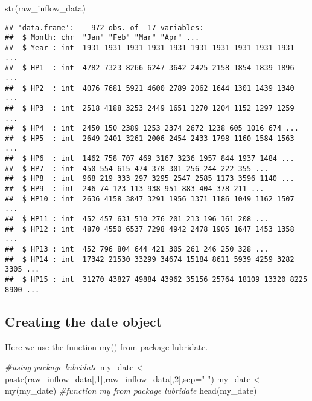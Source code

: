 \documentclass[
]{article}
\newenvironment{Shaded}{\begin{snugshade}}{\end{snugshade}}
\newcommand{\AttributeTok}[1]{\textcolor[rgb]{0.77,0.63,0.00}{#1}}
\newcommand{\CommentTok}[1]{\textcolor[rgb]{0.56,0.35,0.01}{\textit{#1}}}
\newcommand{\DecValTok}[1]{\textcolor[rgb]{0.00,0.00,0.81}{#1}}
\newcommand{\FunctionTok}[1]{\textcolor[rgb]{0.00,0.00,0.00}{#1}}
\newcommand{\NormalTok}[1]{#1}
\newcommand{\OtherTok}[1]{\textcolor[rgb]{0.56,0.35,0.01}{#1}}
\newcommand{\StringTok}[1]{\textcolor[rgb]{0.31,0.60,0.02}{#1}}
\begin{document}
\begin{Shaded}
\begin{Highlighting}[]
\FunctionTok{str}\NormalTok{(raw\_inflow\_data)}
\end{Highlighting}
\end{Shaded}

\begin{verbatim}
## 'data.frame':    972 obs. of  17 variables:
##  $ Month: chr  "Jan" "Feb" "Mar" "Apr" ...
##  $ Year : int  1931 1931 1931 1931 1931 1931 1931 1931 1931 1931 ...
##  $ HP1  : int  4782 7323 8266 6247 3642 2425 2158 1854 1839 1896 ...
##  $ HP2  : int  4076 7681 5921 4600 2789 2062 1644 1301 1439 1340 ...
##  $ HP3  : int  2518 4188 3253 2449 1651 1270 1204 1152 1297 1259 ...
##  $ HP4  : int  2450 150 2389 1253 2374 2672 1238 605 1016 674 ...
##  $ HP5  : int  2649 2401 3261 2006 2454 2433 1798 1160 1584 1563 ...
##  $ HP6  : int  1462 758 707 469 3167 3236 1957 844 1937 1484 ...
##  $ HP7  : int  450 554 615 474 378 301 256 244 222 355 ...
##  $ HP8  : int  968 219 333 297 3295 2547 2585 1173 3596 1140 ...
##  $ HP9  : int  246 74 123 113 938 951 883 404 378 211 ...
##  $ HP10 : int  2636 4158 3847 3291 1956 1371 1186 1049 1162 1507 ...
##  $ HP11 : int  452 457 631 510 276 201 213 196 161 208 ...
##  $ HP12 : int  4870 4550 6537 7298 4942 2478 1905 1647 1453 1358 ...
##  $ HP13 : int  452 796 804 644 421 305 261 246 250 328 ...
##  $ HP14 : int  17342 21530 33299 34674 15184 8611 5939 4259 3282 3305 ...
##  $ HP15 : int  31270 43827 49884 43962 35156 25764 18109 13320 8225 8900 ...
\end{verbatim}

\hypertarget{creating-the-date-object}{%
\subsection{Creating the date object}\label{creating-the-date-object}}

Here we use the function my() from package lubridate.

\begin{Shaded}
\begin{Highlighting}[]
\CommentTok{\#using package lubridate}
\NormalTok{my\_date }\OtherTok{\textless{}{-}} \FunctionTok{paste}\NormalTok{(raw\_inflow\_data[,}\DecValTok{1}\NormalTok{],raw\_inflow\_data[,}\DecValTok{2}\NormalTok{],}\AttributeTok{sep=}\StringTok{"{-}"}\NormalTok{)}
\NormalTok{my\_date }\OtherTok{\textless{}{-}} \FunctionTok{my}\NormalTok{(my\_date)  }\CommentTok{\#function my from package lubridate}
\FunctionTok{head}\NormalTok{(my\_date)}
\end{Highlighting}
\end{Shaded}
\end{document}
